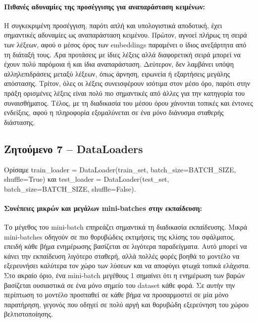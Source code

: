 \documentclass[11pt,a4paper]{article}
\begin{document}
\paragraph{Πιθανές αδυναμίες της προσέγγισης για αναπαράσταση κειμένων:}

Η συγκεκριμένη προσέγγιση, παρότι απλή και υπολογιστικά αποδοτική, έχει σημαντικές αδυναμίες ως αναπαράσταση κειμένου. Πρώτον, αγνοεί πλήρως τη σειρά 
των λέξεων, αφού ο μέσος όρος των \textlatin{embeddings} παραμένει ο ίδιος ανεξάρτητα από τη διάταξή τους. Άρα προτάσεις με ίδιες λέξεις αλλά διαφορετική 
σειρά μπορεί να έχουν πολύ παρόμοια ή και ίδια αναπαράσταση. Δεύτερον, δεν λαμβάνει υπόψη αλληλεπιδράσεις μεταξύ λέξεων, όπως άρνηση, ειρωνεία ή 
εξαρτήσεις μεγάλης απόστασης. Τρίτον, όλες οι λέξεις συνεισφέρουν ισότιμα στον μέσο όρο, παρότι στην πράξη ορισμένες λέξεις είναι πολύ πιο σημαντικές 
από άλλες για την κατηγορία του συναισθήματος. Τέλος, με τη διαδικασία του μέσου όρου χάνονται τοπικές και έντονες ενδείξεις, αφού η πληροφορία 
εξομαλύνεται σε ένα μόνο διάνυσμα σταθερής διάστασης.

\subsection*{Ζητούμενο 7 -- \textlatin{DataLoaders}}


Ορίσαμε \textlatin{train\_loader = DataLoader(train\_set, batch\_size=BATCH\_SIZE, shuffle=True)} και 
\textlatin{test\_loader = DataLoader(test\_set, batch\_size=BATCH\_SIZE, shuffle=False)}.

\paragraph{Συνέπειες μικρών και μεγάλων \textlatin{mini-batches} στην εκπαίδευση:}

Το μέγεθος του \textlatin{mini-batch} επηρεάζει σημαντικά τη διαδικασία εκπαίδευσης. Μικρά \textlatin{mini-batches} οδηγούν σε πιο θορυβώδεις 
εκτιμήσεις της κλίσης του σφάλματος, επειδή κάθε βήμα ενημέρωσης βασίζεται σε λιγότερα παραδείγματα. Αυτό μπορεί να κάνει την εκπαίδευση λιγότερο 
σταθερή, αλλά πολλές φορές βοηθά το μοντέλο να εξερευνήσει καλύτερα τον χώρο των λύσεων και να αποφύγει φτωχά τοπικά ελάχιστα. Στο ακραίο 
όριο, ένα \textlatin{mini-batch} μεγέθους 1 σημαίνει ότι η ενημέρωση των βαρών βασίζεται ουσιαστικά σε ένα μόνο σημείο του \textlatin{dataset} 
κάθε φορά. Σε αυτήν την περίπτωση το μοντέλο προσπαθεί σε κάθε βήμα να προσαρμοστεί σε μία μόνο παρατήρηση, γεγονός που οδηγεί σε πολύ αργή και 
θορυβώδη εξερεύνηση του χώρου βελτιστοποίησης.
\end{document}
